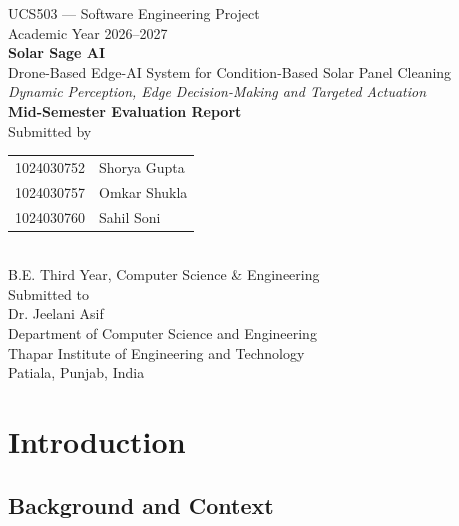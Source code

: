 \documentclass[12pt]{report}
\begin{document}
\begin{titlepage}
    \centering
    \vspace*{1cm}
    {\large UCS503 --- Software Engineering Project}\\
    {\large Academic Year 2026--2027}\\[2cm]

    {\Huge\bfseries Solar Sage AI}\\[0.5cm]
    {\Large Drone-Based Edge-AI System for Condition-Based Solar Panel Cleaning}\\[0.5cm]
    {\large\itshape Dynamic Perception, Edge Decision-Making and Targeted Actuation}\\[1.5cm]

    {\large\bfseries Mid-Semester Evaluation Report}\\[2cm]

    {\large Submitted by}\\[0.5cm]
    \begin{tabular}{l l}
        1024030752 & Shorya Gupta \\
        1024030757 & Omkar Shukla \\
        1024030760 & Sahil Soni \\
    \end{tabular}\\[0.5cm]
    {\large B.E. Third Year, Computer Science \& Engineering}\\[2cm]

    {\large Submitted to}\\[0.5cm]
    {\large Dr. Jeelani Asif}\\[2cm]

    {\large Department of Computer Science and Engineering}\\
    {\large Thapar Institute of Engineering and Technology}\\
    {\large Patiala, Punjab, India}

    \vfill
\end{titlepage}

\tableofcontents
\clearpage

\chapter{Introduction}

\section{Background and Context}
\end{document}
